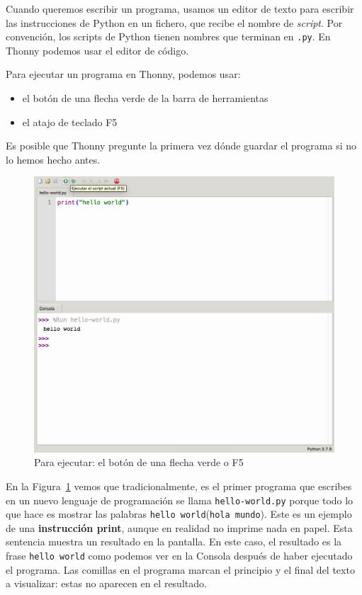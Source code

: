 Cuando queremos escribir un programa, usamos un editor de texto para
escribir las instrucciones de Python en un fichero, que recibe el nombre
de \emph{script}. Por convención, los scripts de Python tienen nombres
que terminan en \texttt{.py}. En Thonny podemos usar el editor de código. 


Para ejecutar un programa en Thonny, podemos usar:

\begin{itemize}
    \item el botón de una flecha verde de la barra de herramientas
    \item el atajo de teclado F5
\end{itemize}
Es posible que Thonny pregunte la primera vez dónde guardar el programa si no lo hemos hecho antes. 

\begin{figure}
    \centering
    \includegraphics[width=.85\textwidth]{images/Thonny-execute.png}
    \caption{Para ejecutar: el botón de una flecha verde o F5 }
    \label{fig:thonny-execute}
\end{figure}


En la Figura~\ref{fig:thonny-execute} vemos que tradicionalmente, es el primer programa que escribes en un nuevo lenguaje
de programación se llama \verb|hello-world.py| porque todo lo que hace es mostrar las palabras \verb|hello world|(\verb|hola mundo|).  
Este es un ejemplo de una \textbf{instrucción print}, aunque
en realidad no imprime nada en papel.  Esta sentencia muestra un resultado en la
pantalla.  En este caso, el resultado es la frase \verb|hello world| como podemos ver en la Consola después de haber ejecutado el programa.
Las comillas en el programa marcan el principio y el final
del texto a visualizar: estas no aparecen en el resultado.




